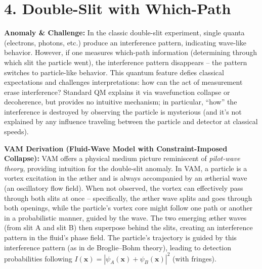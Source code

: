 \documentclass[a4paper, aps,preprint,superscriptaddress, 12pt]{revtex4}
\begin{document}
\section*{4. Double-Slit with Which-Path}

\textbf{Anomaly \& Challenge: } In the classic double-slit experiment, single quanta (electrons, photons, etc.) produce an interference pattern, indicating wave-like behavior. However, if one measures which-path information (determining through which slit the particle went), the interference pattern disappears – the pattern switches to particle-like behavior. This quantum feature defies classical expectations and challenges interpretations: how can the act of measurement erase interference? Standard QM explains it via wavefunction collapse or decoherence, but provides no intuitive mechanism; in particular, “how” the interference is destroyed by observing the particle is mysterious (and it’s not explained by any influence traveling between the particle and detector at classical speeds).


\textbf{VAM Derivation (Fluid-Wave Model with Constraint-Imposed Collapse):} VAM offers a physical medium picture reminiscent of \textit{pilot-wave theory}, providing intuition for the double-slit anomaly. In VAM, a particle is a vortex excitation in the æther and is always accompanied by an ætherial wave (an oscillatory flow field). When not observed, the vortex can effectively pass through both slits at once – specifically, the æther wave splits and goes through both openings, while the particle’s vortex core might follow one path or another in a probabilistic manner, guided by the wave. The two emerging æther waves (from slit A and slit B) then superpose behind the slits, creating an interference pattern in the fluid’s phase field. The particle’s trajectory is guided by this interference pattern (as in de Broglie–Bohm theory), leading to detection probabilities following $I(\mathbf{x}) = |\psi_A(\mathbf{x}) + \psi_B(\mathbf{x})|^2$ (with fringes).
\end{document}
